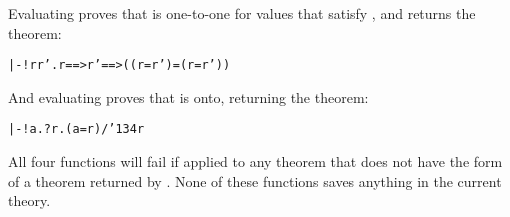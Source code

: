 \noindent Evaluating  proves that 
is one-to-one for values that satisfy , and returns the theorem:

{\def\bk{\char'134}
\begin{hol}\begin{alltt}
   |- !r r'.  r ==>  r' ==> (( r =  r') = (r = r'))
\end{alltt}\end{hol}}

\noindent And evaluating  proves that 
is onto, returning the theorem:

{\def\bk{\char'134}
\begin{hol}\begin{alltt}
   |- !a. ?r. (a =  r) /\bk {} r
\end{alltt}\end{hol}}

\noindent All four functions will fail if applied to any theorem that does not
have the form of a theorem returned by .
None of these functions saves anything in the current theory.



